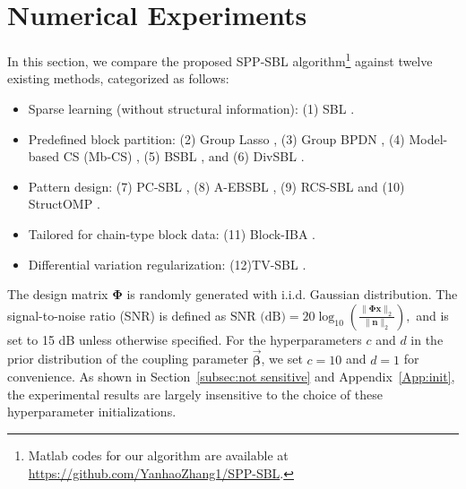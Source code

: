 \documentclass[lettersize,journal]{IEEEtran}
\theoremstyle{remark}
\begin{document}
\section{Numerical Experiments}\label{experiment}

In this section, we compare the proposed SPP-SBL algorithm\footnote{Matlab codes for our algorithm are available at \url{https://github.com/YanhaoZhang1/SPP-SBL}.} against twelve existing methods, categorized as follows:  
\begin{itemize}
	\item Sparse learning (without structural information): (1) SBL \cite{tipping2001sparse}.
	\item Predefined block partition: (2) Group Lasso \cite{yuan2006model}, (3) Group BPDN \cite{van2011sparse}, (4) Model-based CS (Mb-CS) \cite{baraniuk2010model}, (5) BSBL \cite{zhang2013extension}, and (6) DivSBL \cite{NEURIPS2024_ead542f1}.
	\item Pattern design: (7) PC-SBL \cite{fang2014pattern}, (8) A-EBSBL \cite{wang2018alternative}, (9) RCS-SBL \cite{wang2020structured} and (10) StructOMP \cite{huang2009learning}.
	\item Tailored for chain-type block data: (11) Block-IBA \cite{korki2016iterative}.
	\item Differential variation regularization: (12)TV-SBL \cite{sant2022block}. 
\end{itemize}

The design matrix \( \boldsymbol{\Phi }\) is randomly generated with i.i.d. Gaussian distribution. The signal-to-noise ratio (SNR) is defined as  
$
\text{SNR (dB)} = 20 \log_{10}\left( \frac{\| \boldsymbol{\Phi } \mathbf{x}\|_2}{\|\mathbf{n}\|_2} \right),
$
and is set to 15 dB unless otherwise specified. 
For the hyperparameters $c$ and $d$ in the prior distribution of the coupling parameter $\vec{\boldsymbol{\beta}}$, we set $c=10$ and $d=1$ for convenience. As shown in Section~\ref{subsec:not sensitive} and Appendix~\ref{App:init}, the experimental results are largely insensitive to the choice of these hyperparameter initializations.
\end{document}
